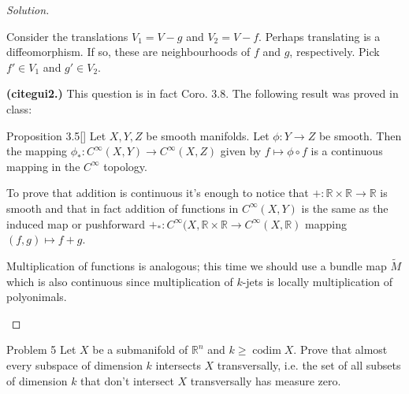 \begin{proof}[Solution]
\begin{enumerate}[label=(\alph*)]
	Consider the translations \(V_1=V-g\) and \(V_2=V-f\). Perhaps translating is a diffeomorphism. If so, these are neighbourhoods of \(f\) and \(g\), respectively. Pick \(f' \in V_1\) and \(g' \in V_2\).

	
	\textbf{(cite{gui2}.)} This question is in fact Coro. 3.8. The following result was proved in class:

	\begin{thing6}{Proposition 3.5}[\cite{gui2}]\label{prop:3.5}\leavevmode
Let \(X,Y,Z\) be smooth manifolds. Let \(\phi:Y \to Z\) be smooth. Then the mapping \(\phi_*:C^\infty (X,Y) \to C^\infty(X,Z)\) given by \(f \mapsto \phi \circ f\) is a continuous mapping in the \(C^\infty\) topology.
	\end{thing6}
	To prove that addition is continuous it's enough to notice that \(+: \mathbb{R} \times \mathbb{R} \to \mathbb{R}\) is smooth and that in fact addition of functions in \(C^\infty(X,Y)\) is the same as the induced map or pushforward \(+_*:C^\infty(X,\mathbb{R} \times \mathbb{R} \to C^\infty(X,\mathbb{R})\) mapping \((f,g) \mapsto f+g\).\fi

	Multiplication of functions is analogous; this time we should use a bundle map \(\tilde{M}\) which is also continuous since multiplication of \(k\)-jets is locally multiplication of polyonimals.
\end{enumerate}
\end{proof}

\begin{thing1}{Problem 5}\label{prob:5}\leavevmode
Let \(X\) be a submanifold of \(\mathbb{R}^n\) and \(k \geq  \operatorname{codim}X\). Prove that almost every subspace of dimension \(k\) intersects \(X\) transversally, i.e. the set of all subsets of dimension \(k\) that don't intersect \(X\) transversally has measure zero.
\end{thing1}

